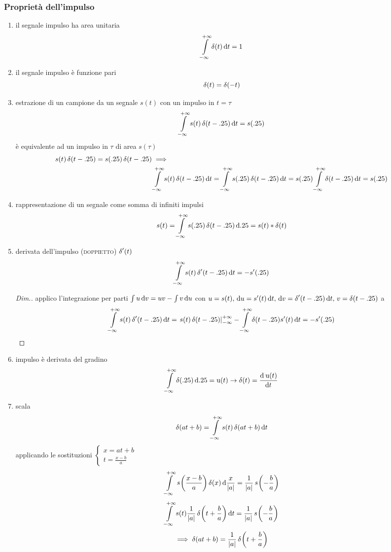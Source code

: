 \subsubsection{Proprietà dell'impulso}
\begin{enumerate}
\item il segnale impulso ha area unitaria \[ \intinf{\impulse(t)}{t}=1 \]
\item il segnale impulso è funzione pari \[ \impulse(t)=\impulse(-t) \]
\item estrazione di un campione da un segnale $s(t)$ con un impulso in $t=\tau$ \[ \intinf{s(t)\impulse(t-\tau)}{t}=s(\tau) \]
è equivalente ad un impulso in $\tau$ di area $s(\tau)$
\begin{align*}
 s(t)\impulse(t-\tau)=s(\tau)\impulse(t-\tau) &\implies \\ & \intinf{s(t)\impulse(t-\tau)}{t} =\intinf{s(\tau)\impulse(t-\tau)}{t} = s(\tau)\intinf{\impulse(t-\tau)}{t} = s(\tau)
 \end{align*}

\item rappresentazione di un segnale come somma di infiniti impulsi
\[s(t)=\intinf{s(\tau)\impulse(t-\tau)}{\tau}=s(t)\ast\impulse(t)\]
\item derivata dell'impulso (\textsc{doppietto}) $\impulse'(t)$
\[ \intinf{s(t)\impulse'(t-\tau)}{t}=-s'(\tau) \]
\begin{proof}[Dim.]
applico l'integrazione per parti $\int{u \diff v}=u v-\int{v\diff u}$ con $u=s(t) ,\, \diff u=s'(t)\diff t ,\, \diff v=\impulse'(t-\tau)\diff t ,\, v=\impulse(t-\tau)$  a
\[\intinf{s(t)\impulse'(t-\tau)}{t}= \restrict{s(t)\impulse(t-\tau)}{-\infty}^{+\infty} -\intinf{\impulse(t-\tau)s'(t)}{t}=-s'(\tau)  \]
\end{proof}
\item impulso è derivata del gradino
\[\intinf{\impulse(\tau)}{\tau}=\step(t)  \to \impulse(t)=\deriv{\step(t)}{t} \]
\item scala
\[\impulse(a t+b)=\intinf{s(t)\impulse(a t+b)}{t}\]
applicando le sostituzioni $\begin{cases}x=a t+b \\ t=\frac{x-b}{a}\end{cases}$
\[\intinf{\f{s}{\frac{x-b}{a}}\impulse(x)}{\frac{x}{\abs{a}}}=\frac{1}{\abs{a}}\f{s}{-\frac{b}{a}}\]
\[\intinf{s(t)\frac{1}{\abs{a}}\f{\impulse}{t+\frac{b}{a}}}{t}=\frac{1}{\abs{a}}\f{s}{-\frac{b}{a}}\]
\[\implies\impulse(a t+b)=\frac{1}{\abs{a}}\f{\impulse}{t+\frac{b}{a}} \]

\end{enumerate}

